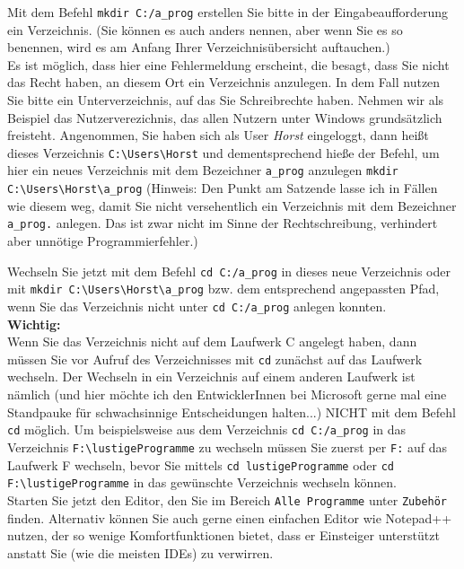 Mit dem Befehl \verb|mkdir C:/a_prog| erstellen Sie bitte in der Eingabeaufforderung ein Verzeichnis. (Sie können es auch anders nennen, aber wenn Sie es so benennen, wird es am Anfang Ihrer Verzeichnisübersicht auftauchen.)\\

Es ist möglich, dass hier eine Fehlermeldung erscheint, die besagt, dass Sie nicht das Recht haben, an diesem Ort ein Verzeichnis anzulegen. In dem Fall nutzen Sie bitte ein Unterverzeichnis, auf das Sie Schreibrechte haben. Nehmen wir als Beispiel das Nutzerverezichnis, das allen Nutzern unter Windows grundsätzlich freisteht. Angenommen, Sie haben sich als User \emph{Horst} eingeloggt, dann heißt dieses Verzeichnis \verb|C:\Users\Horst| und dementsprechend hieße der Befehl, um hier ein neues Verzeichnis mit dem Bezeichner \verb|a_prog| anzulegen \verb|mkdir C:\Users\Horst\a_prog| (Hinweis: Den Punkt am Satzende lasse ich in Fällen wie diesem weg, damit Sie nicht versehentlich ein Verzeichnis mit dem Bezeichner \verb|a_prog.| anlegen. Das ist zwar nicht im Sinne der Rechtschreibung, verhindert aber unnötige Programmierfehler.)

Wechseln Sie jetzt mit dem Befehl \verb|cd C:/a_prog| in dieses neue Verzeichnis oder mit \verb|mkdir C:\Users\Horst\a_prog| bzw. dem entsprechend angepassten Pfad, wenn Sie das Verzeichnis nicht unter \verb|cd C:/a_prog| anlegen konnten.\\

\textbf{Wichtig:}\\

Wenn Sie das Verzeichnis nicht auf dem Laufwerk C angelegt haben, dann müssen Sie vor Aufruf des Verzeichnisses mit \verb|cd| zunächst auf das Laufwerk wechseln. Der Wechseln in ein Verzeichnis auf einem anderen Laufwerk ist nämlich (und hier möchte ich den EntwicklerInnen bei Microsoft gerne mal eine Standpauke für schwachsinnige Entscheidungen halten...) NICHT mit dem Befehl \verb|cd| möglich. Um  beispielsweise aus dem Verzeichnis \verb|cd C:/a_prog| in das Verzeichnis \verb|F:\lustigeProgramme| zu wechseln müssen Sie zuerst per \verb|F:| auf das Laufwerk F wechseln, bevor Sie mittels \verb|cd lustigeProgramme| oder \verb|cd F:\lustigeProgramme| in das gewünschte Verzeichnis wechseln können.\\

Starten Sie jetzt den Editor, den Sie im Bereich \verb|Alle Programme| unter \verb|Zubehör| finden. Alternativ können Sie auch gerne einen einfachen Editor wie Notepad++ nutzen, der so wenige Komfortfunktionen bietet, dass er Einsteiger unterstützt anstatt Sie (wie die meisten IDEs) zu verwirren.\\

